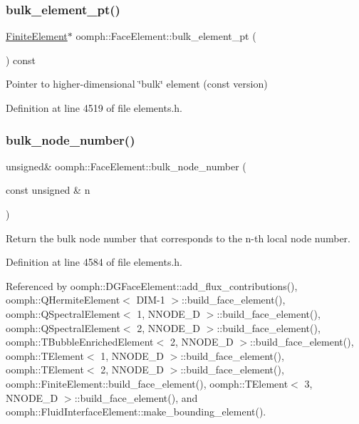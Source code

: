 \subsubsection{\texorpdfstring{bulk\+\_\+element\+\_\+pt()}{bulk\_element\_pt()}\hspace{0.1cm}{\footnotesize\ttfamily [2/2]}}
{\footnotesize\ttfamily \hyperlink{classoomph_1_1FiniteElement}{Finite\+Element}$\ast$ oomph\+::\+Face\+Element\+::bulk\+\_\+element\+\_\+pt (\begin{DoxyParamCaption}{ }\end{DoxyParamCaption}) const\hspace{0.3cm}{\ttfamily [inline]}}



Pointer to higher-\/dimensional \char`\"{}bulk\char`\"{} element (const version) 



Definition at line 4519 of file elements.\+h.

\mbox{\label{classoomph_1_1FaceElement_ae437e62de81be4c4183de872d1119b16}} 
\subsubsection{\texorpdfstring{bulk\+\_\+node\+\_\+number()}{bulk\_node\_number()}\hspace{0.1cm}{\footnotesize\ttfamily [1/2]}}
{\footnotesize\ttfamily unsigned\& oomph\+::\+Face\+Element\+::bulk\+\_\+node\+\_\+number (\begin{DoxyParamCaption}\item[{const unsigned \&}]{n }\end{DoxyParamCaption})\hspace{0.3cm}{\ttfamily [inline]}}



Return the bulk node number that corresponds to the n-\/th local node number. 



Definition at line 4584 of file elements.\+h.



Referenced by oomph\+::\+D\+G\+Face\+Element\+::add\+\_\+flux\+\_\+contributions(), oomph\+::\+Q\+Hermite\+Element$<$ D\+I\+M-\/1 $>$\+::build\+\_\+face\+\_\+element(), oomph\+::\+Q\+Spectral\+Element$<$ 1, N\+N\+O\+D\+E\+\_\+D $>$\+::build\+\_\+face\+\_\+element(), oomph\+::\+Q\+Spectral\+Element$<$ 2, N\+N\+O\+D\+E\+\_\+D $>$\+::build\+\_\+face\+\_\+element(), oomph\+::\+T\+Bubble\+Enriched\+Element$<$ 2, N\+N\+O\+D\+E\+\_\+D $>$\+::build\+\_\+face\+\_\+element(), oomph\+::\+T\+Element$<$ 1, N\+N\+O\+D\+E\+\_\+D $>$\+::build\+\_\+face\+\_\+element(), oomph\+::\+T\+Element$<$ 2, N\+N\+O\+D\+E\+\_\+D $>$\+::build\+\_\+face\+\_\+element(), oomph\+::\+Finite\+Element\+::build\+\_\+face\+\_\+element(), oomph\+::\+T\+Element$<$ 3, N\+N\+O\+D\+E\+\_\+D $>$\+::build\+\_\+face\+\_\+element(), and oomph\+::\+Fluid\+Interface\+Element\+::make\+\_\+bounding\+\_\+element().

